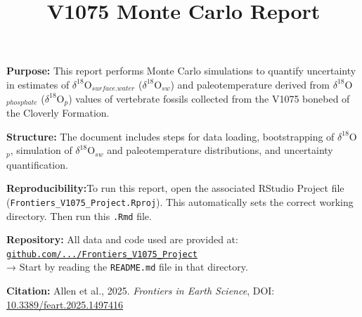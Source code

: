 \documentclass[
]{article}
\title{V1075 Monte Carlo Report}
\author{}
\date{\vspace{-2.5em}}
\begin{document}
\maketitle

{
\setcounter{tocdepth}{2}
\tableofcontents
}
\vspace{1em}
\begin{center}
\begin{minipage}{0.95\textwidth}
\setlength{\fboxsep}{10pt}
\noindent\colorbox{gray!10}{
  \parbox{\textwidth}{
    \textbf{\large Purpose:} This report performs Monte Carlo simulations to quantify uncertainty in estimates of $\delta^{18}$O$_{surface.water}$ ($\delta^{18}$O$_{sw}$) and paleotemperature derived from $\delta^{18}$O$_{phosphate}$ ($\delta^{18}$O$_{p}$) values of vertebrate fossils collected from the V1075 bonebed of the Cloverly Formation.

    \vspace{0.5em}

    \textbf{\large Structure:} The document includes steps for data loading, bootstrapping of $\delta^{18}$O$_{p}$, simulation of $\delta^{18}$O$_{sw}$ and paleotemperature distributions, and uncertainty quantification.

    \vspace{0.5em}

    \textbf{\large Reproducibility:}To run this report, open the associated RStudio Project file (\texttt{Frontiers\_V1075\_Project.Rproj}). This automatically sets the correct working directory. Then run this \texttt{.Rmd} file.

    \vspace{0.5em}

    \textbf{\large Repository:} All data and code used are provided at:
    \href{https://github.com/mattgeo1990/Frontiers-Allen-et-al.-2025/tree/main/Frontiers_V1075_Project}{\color{blue}\texttt{github.com/.../Frontiers\_V1075\_Project}}\\
    → Start by reading the \texttt{README.md} file in that directory.

    \vspace{0.5em}

    \textbf{\large Citation:} Allen et al., 2025. \textit{Frontiers in Earth Science}, DOI:\\
    \href{https://doi.org/10.3389/feart.2025.1497416}{10.3389/feart.2025.1497416}
  }
}
\end{minipage}
\end{center}
\vspace{2em}
\end{document}
